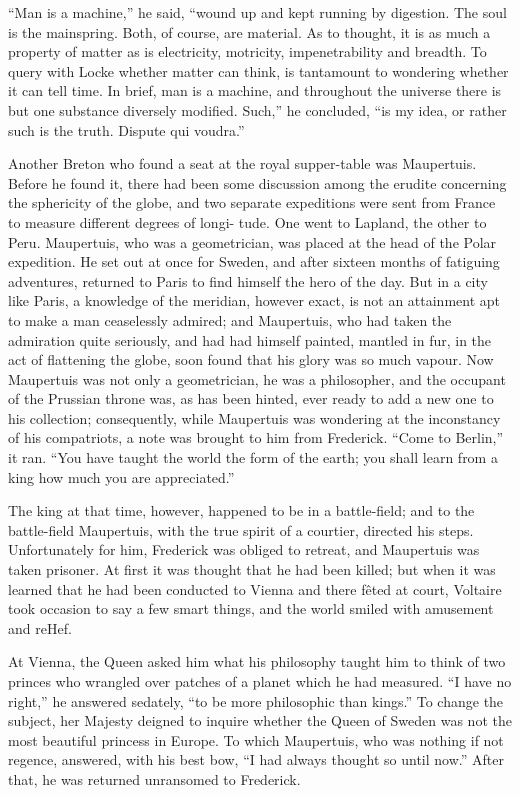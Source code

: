 \documentclass[]{book}
\begin{document}
``Man is a machine,'' he said, ``wound up and kept running by digestion.
The soul is the mainspring. Both, of course, are material. As to
thought, it is as much a property of matter as is electricity,
motricity, impenetrability and breadth. To query with Locke whether
matter can think, is tantamount to wondering whether it can tell time.
In brief, man is a machine, and throughout the universe there is but one
substance diversely modified. Such,'' he concluded, ``is my idea, or
rather such is the truth. Dispute qui voudra.''

Another Breton who found a seat at the royal supper-table was
Maupertuis. Before he found it, there had been some discussion among the
erudite concerning the sphericity of the globe, and two separate
expeditions were sent from France to measure different degrees of longi-
tude. One went to Lapland, the other to Peru. Maupertuis, who was a
geometrician, was placed at the head of the Polar expedition. He set out
at once for Sweden, and after sixteen months of fatiguing adventures,
returned to Paris to find himself the hero of the day. But in a city
like Paris, a knowledge of the meridian, however exact, is not an
attainment apt to make a man ceaselessly admired; and Maupertuis, who
had taken the admiration quite seriously, and had had himself painted,
mantled in fur, in the act of flattening the globe, soon found that his
glory was so much vapour. Now Maupertuis was not only a geometrician, he
was a philosopher, and the occupant of the Prussian throne was, as has
been hinted, ever ready to add a new one to his collection;
consequently, while Maupertuis was wondering at the inconstancy of his
compatriots, a note was brought to him from Frederick. ``Come to
Berlin,'' it ran. ``You have taught the world the form of the earth; you
shall learn from a king how much you are appreciated.''

The king at that time, however, happened to be in a battle-field; and to
the battle-field Maupertuis, with the true spirit of a courtier,
directed his steps. Unfortunately for him, Frederick was obliged to
retreat, and Maupertuis was taken prisoner. At first it was thought that
he had been killed; but when it was learned that he had been conducted
to Vienna and there fêted at court, Voltaire took occasion to say a few
smart things, and the world smiled with amusement and reHef.

At Vienna, the Queen asked him what his philosophy taught him to think
of two princes who wrangled over patches of a planet which he had
measured. ``I have no right,'' he answered sedately, ``to be more
philosophic than kings.'' To change the subject, her Majesty deigned to
inquire whether the Queen of Sweden was not the most beautiful princess
in Europe. To which Maupertuis, who was nothing if not regence,
answered, with his best bow, ``I had always thought so until now.''
After that, he was returned unransomed to Frederick.
\end{document}
